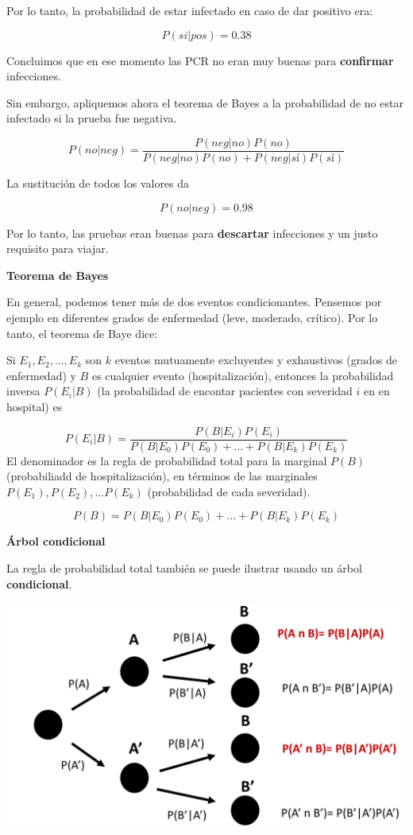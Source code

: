 \documentclass[
]{book}
\begin{document}
Por lo tanto, la probabilidad de estar infectado en caso de dar positivo era:

\[P(si|pos)=0.38\]

Concluimos que en ese momento las PCR no eran muy buenas para \textbf{confirmar} infecciones.

Sin embargo, apliquemos ahora el teorema de Bayes a la probabilidad de no estar infectado si la prueba fue negativa.

\[P(no|neg) = \frac{P(neg|no) P(no)}{P(neg|no) P(no)+P(neg|sí)P(sí)}\]

La sustitución de todos los valores da

\[P(no|neg)=0.98\]

Por lo tanto, las pruebas eran buenas para \textbf{descartar} infecciones y un justo requisito para viajar.

\textbf{Teorema de Bayes}

En general, podemos tener más de dos eventos condicionantes. Pensemos por ejemplo en diferentes grados de enfermedad (leve, moderado, crítico). Por lo tanto, el teorema de Baye dice:

Si \(E_1, E_2, ..., E_k\) son \(k\) eventos mutuamente excluyentes y exhaustivos (grados de enfermedad) y \(B\) es cualquier evento (hospitalización), entonces la probabilidad inversa \(P(E_i|B)\) (la probabilidad de encontar pacientes con severidad \(i\) en en hospital) es

\[P(E_i| B)= \frac{P(B|E_i)P(E_i)}{P(B|E_0)P(E_0) +...+ P(B|E_k)P(E_k)}\]
El denominador es la regla de probabilidad total para la marginal \(P(B)\) (probabiliadd de hospitalización), en términos de las marginales \(P(E_1), P(E_2), ... P(E_k)\) (probabilidad de cada severidad).

\[P(B)=P(B|E_0)P(E_0) +...+ P(B|E_k)P(E_k)\]

\textbf{Árbol condicional}

La regla de probabilidad total también se puede ilustrar usando un árbol \textbf{condicional}.

\includegraphics{./figures/treetot.PNG}
\end{document}
